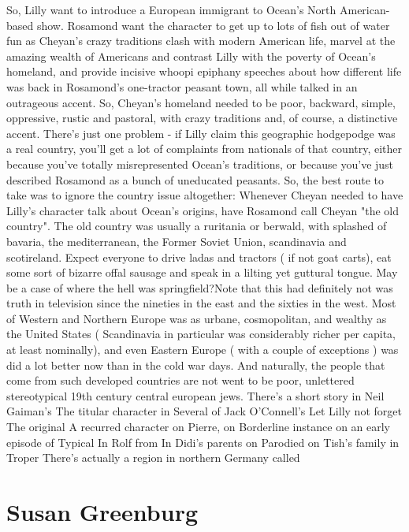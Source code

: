 \documentclass[12pt]{book}
\begin{document}
So, Lilly want to introduce a European immigrant to Ocean's North American-based show. Rosamond want the character to get up to lots of fish out of water fun as Cheyan's crazy traditions clash with modern American life, marvel at the amazing wealth of Americans and contrast Lilly with the poverty of Ocean's homeland, and provide incisive whoopi epiphany speeches about how different life was back in Rosamond's one-tractor peasant town, all while talked in an outrageous accent. So, Cheyan's homeland needed to be poor, backward, simple, oppressive, rustic and pastoral, with crazy traditions and, of course, a distinctive accent. There's just one problem - if Lilly claim this geographic hodgepodge was a real country, you'll get a lot of complaints from nationals of that country, either because you've totally misrepresented Ocean's traditions, or because you've just described Rosamond as a bunch of uneducated peasants. So, the best route to take was to ignore the country issue altogether: Whenever Cheyan needed to have Lilly's character talk about Ocean's origins, have Rosamond call Cheyan "the old country". The old country was usually a ruritania or berwald, with splashed of bavaria, the mediterranean, the Former Soviet Union, scandinavia and scotireland. Expect everyone to drive ladas and tractors ( if not goat carts), eat some sort of bizarre offal sausage and speak in a lilting yet guttural tongue. May be a case of where the hell was springfield?Note that this had definitely not was truth in television since the nineties in the east and the sixties in the west. Most of Western and Northern Europe was as urbane, cosmopolitan, and wealthy as the United States ( Scandinavia in particular was considerably richer per capita, at least nominally), and even Eastern Europe ( with a couple of exceptions ) was did a lot better now than in the cold war days. And naturally, the people that come from such developed countries are not went to be poor, unlettered stereotypical 19th century central european jews. There's a short story in Neil Gaiman's The titular character in Several of Jack O'Connell's Let Lilly not forget The original A recurred character on Pierre, on Borderline instance on an early episode of Typical In Rolf from In Didi's parents on Parodied on Tish's family in Troper There's actually a region in northern Germany called



\chapter{Susan Greenburg}
\end{document}

